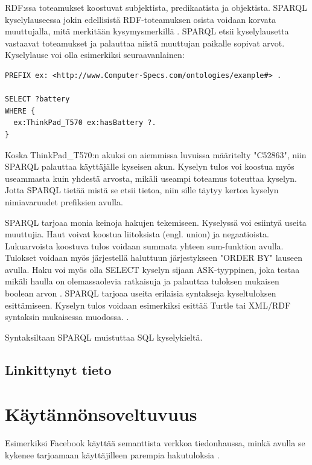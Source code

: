 \documentclass[finnish, 12pt, a4paper, elec, utf8, pdfa, online]{aaltothesis}
\begin{document}
RDF:ssa toteamukset koostuvat subjektista, predikaatista ja objektista. SPARQL kyselylauseessa jokin edellisistä RDF-toteamuksen osista voidaan korvata muuttujalla, mitä merkitään kysymysmerkillä \cite{Antoniou}. SPARQL etsii kyselylausetta vastaavat toteamukset ja palauttaa niistä muuttujan paikalle sopivat arvot. Kyselylause voi olla esimerkiksi seuraavanlainen:

\begin{lstlisting}[style=codeblock]
PREFIX ex: <http://www.Computer-Specs.com/ontologies/example#> .

SELECT ?battery
WHERE {
  ex:ThinkPad_T570 ex:hasBattery ?.
}
\end{lstlisting}

Koska ThinkPad\_T570:n akuksi on aiemmissa luvuissa määritelty "C52863", niin SPARQL palauttaa käyttäjälle kyseisen akun. Kyselyn tulos voi koostua myös useammasta kuin yhdestä arvosta, mikäli useampi toteamus toteuttaa kyselyn. Jotta SPARQL tietää mistä se etsii tietoa, niin sille täytyy kertoa kyselyn nimiavaruudet prefiksien avulla.

SPARQL tarjoaa monia keinoja hakujen tekemiseen. Kyselyssä voi esiintyä useita muuttujia.
Haut voivat koostua liitoksista (engl. union) ja negaatioista. Lukuarvoista koostuva tulos voidaan summata yhteen sum-funktion avulla. Tulokset voidaan myös järjestellä haluttuun järjestykseen "ORDER BY" lauseen avulla. Haku voi myös olla SELECT kyselyn sijaan ASK-tyyppinen, joka testaa mikäli haulla on olemassaolevia ratkaisuja ja palauttaa tuloksen mukaisen boolean arvon \cite{sparql_query}. SPARQL tarjoaa useita erilaisia syntakseja kyseltuloksen esittämiseen. Kyselyn tulos voidaan esimerkiksi esittää Turtle tai XML/RDF syntaksin mukaisessa muodossa. \cite{W3C_turtle}.

Syntaksiltaan SPARQL muistuttaa SQL kyselykieltä.


\clearpage

\subsection{Linkittynyt tieto}

\clearpage
\section{Käytännönsoveltuvuus}
Esimerkiksi Facebook käyttää semanttista verkkoa tiedonhaussa, minkä avulla se kykenee tarjoamaan käyttäjilleen parempia hakutuloksia \cite{Facebook}.
\end{document}
